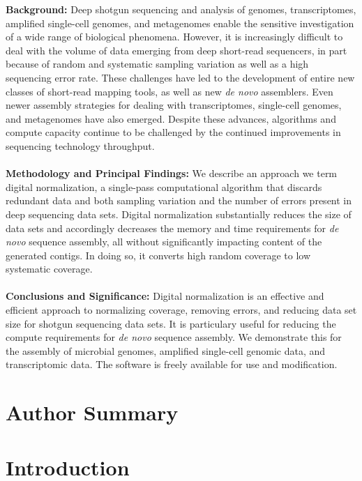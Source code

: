 \documentclass[10pt]{article}
\begin{document}
{\bf Background:} Deep shotgun sequencing and analysis of genomes,
transcriptomes, amplified single-cell genomes, and metagenomes enable
the sensitive investigation of a wide range of biological
phenomena. However, it is increasingly difficult to deal with the
volume of data emerging from deep short-read sequencers, in part
because of random and systematic sampling variation as well as a high
sequencing error rate.  These challenges have led to the development of
entire new classes of short-read mapping tools, as well as new {\em de novo}
assemblers.  Even newer assembly strategies for dealing with
transcriptomes, single-cell genomes, and metagenomes have also
emerged.  Despite these advances, algorithms and compute capacity
continue to be challenged by the continued improvements in sequencing
technology throughput.
\\
\\
{\bf Methodology and Principal Findings:} We describe an approach we term
digital normalization, a single-pass computational algorithm that
discards redundant data and both sampling variation and the number of errors
present in deep sequencing data sets. Digital normalization substantially
reduces the size of data sets and accordingly decreases the memory and time
requirements for {\em de novo} sequence assembly, all without significantly
impacting content of the generated contigs.  In doing so, it converts
high random coverage to low systematic coverage.
\\
\\
{\bf Conclusions and Significance:} Digital normalization is an
effective and efficient approach to normalizing coverage, removing errors,
and reducing data set size for shotgun sequencing data sets.
It is particulary useful for reducing the compute requirements for
{\em de novo} sequence assembly.  We demonstrate this for the assembly
of microbial genomes, amplified single-cell genomic data, and
transcriptomic data.  The software is freely available for use and
modification.

\section*{Author Summary}

\section*{Introduction}
\end{document}
